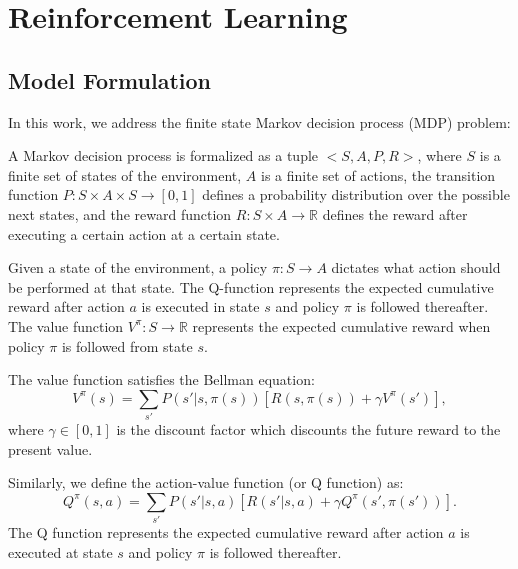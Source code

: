 
\chapter{Reinforcement Learning}
\label{ch:RL}
\section{Model Formulation}

In this work, we address the finite state Markov decision process (MDP) problem:
\begin{definition} A Markov decision process is formalized as a tuple $<S, A, P, R>$, where $S$ is a finite set of states of the environment, $A$ is
 a finite set of actions, the transition function $P:S \times A \times S \rightarrow [0, 1]$ defines a
 probability distribution over the possible next states, and the reward function $R:S \times A \rightarrow \mathbb{R}$ defines
 the reward after executing a certain action at a certain state.
\end{definition}

Given a state of the environment, a policy $\pi: S \rightarrow A$ dictates what action should be performed at that state. 
The Q-function represents the expected cumulative reward after action $a$ is executed in state $s$ and 
policy $\pi$ is followed thereafter.
The value function $V^{\pi}: S \rightarrow \mathbb{R}$ represents the expected cumulative reward when 
policy $\pi$ is followed from state $s$.

The value function satisfies the Bellman equation:
\begin{equation}
    V^{\pi}(s) = \sum_{s'}P(s'|s, \pi(s))[R(s, \pi(s)) + \gamma V^{\pi}(s')],
    \label{eq:V}
\end{equation}
where $\gamma \in [0, 1]$ is the discount factor which discounts the future reward to the present value.

Similarly, we define the action-value function (or Q function) as:
\begin{equation}
    Q^{\pi}(s, a) = \sum_{s'}P(s'|s, a)[R(s'|s, a) + \gamma Q^{\pi}(s', \pi(s'))].
    \label{eq:Q}
\end{equation}
The Q function represents the expected cumulative reward after action $a$ is executed at state $s$ and 
policy $\pi$ is followed thereafter.

